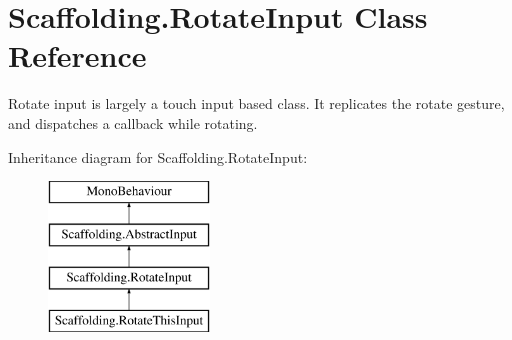 \hypertarget{class_scaffolding_1_1_rotate_input}{\section{Scaffolding.\+Rotate\+Input Class Reference}
\label{class_scaffolding_1_1_rotate_input}
}


Rotate input is largely a touch input based class. It replicates the rotate gesture, and dispatches a callback while rotating.  


Inheritance diagram for Scaffolding.\+Rotate\+Input\+:\begin{figure}[H]
\begin{center}
\leavevmode
\includegraphics[height=4.000000cm]{class_scaffolding_1_1_rotate_input}
\end{center}
\end{figure}
